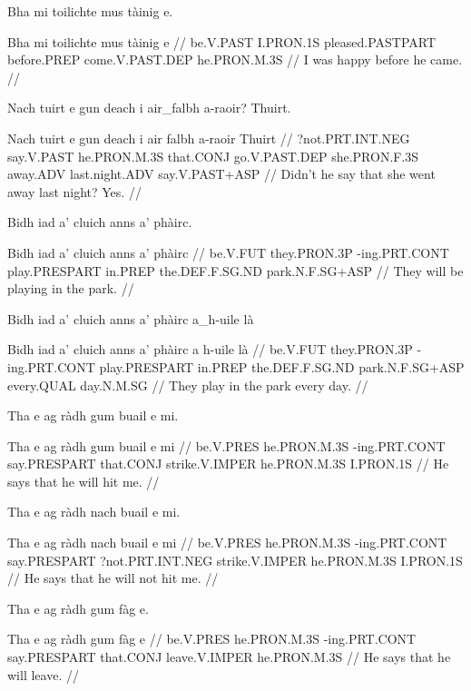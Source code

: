 \documentclass[a4paper,10pt]{article}
\begin{document}
\ex
\begingl
\glpre Bha mi toilichte mus tàinig e. 

\vspace{4mm}
\gla Bha mi toilichte mus tàinig e  //
\glb be.V.PAST I.PRON.1S pleased.PASTPART before.PREP come.V.PAST.DEP he.PRON.M.3S  //
\glft I was happy before he came. //
\endgl
\xe

\ex
\begingl
\glpre Nach tuirt e gun deach i air\_falbh a-raoir? Thuirt. 

\vspace{4mm}
\gla Nach tuirt e gun deach i {air falbh} a-raoir Thuirt  //
\glb ?not.PRT.INT.NEG say.V.PAST he.PRON.M.3S that.CONJ go.V.PAST.DEP she.PRON.F.3S away.ADV last.night.ADV say.V.PAST+ASP  //
\glft Didn't he say that she went away last night? Yes. //
\endgl
\xe

\ex
\begingl
\glpre Bidh iad a' cluich anns a' phàirc. 

\vspace{4mm}
\gla Bidh iad a' cluich anns a' phàirc  //
\glb be.V.FUT they.PRON.3P -ing.PRT.CONT play.PRESPART in.PREP the.DEF.F.SG.ND park.N.F.SG+ASP  //
\glft They will be playing in the park. //
\endgl
\xe

\ex
\begingl
\glpre Bidh iad a' cluich anns a' phàirc a\_h-uile là 

\vspace{4mm}
\gla Bidh iad a' cluich anns a' phàirc {a h-uile} là  //
\glb be.V.FUT they.PRON.3P -ing.PRT.CONT play.PRESPART in.PREP the.DEF.F.SG.ND park.N.F.SG+ASP every.QUAL day.N.M.SG  //
\glft They play in the park every day. //
\endgl
\xe

\ex
\begingl
\glpre Tha e ag ràdh gum buail e mi. 

\vspace{4mm}
\gla Tha e ag ràdh gum buail e mi  //
\glb be.V.PRES he.PRON.M.3S -ing.PRT.CONT say.PRESPART that.CONJ strike.V.IMPER he.PRON.M.3S I.PRON.1S  //
\glft He says that he will hit me. //
\endgl
\xe

\ex
\begingl
\glpre Tha e ag ràdh nach buail e mi. 

\vspace{4mm}
\gla Tha e ag ràdh nach buail e mi  //
\glb be.V.PRES he.PRON.M.3S -ing.PRT.CONT say.PRESPART ?not.PRT.INT.NEG strike.V.IMPER he.PRON.M.3S I.PRON.1S  //
\glft He says that he will not hit me. //
\endgl
\xe

\ex
\begingl
\glpre Tha e ag ràdh gum fàg e. 

\vspace{4mm}
\gla Tha e ag ràdh gum fàg e  //
\glb be.V.PRES he.PRON.M.3S -ing.PRT.CONT say.PRESPART that.CONJ leave.V.IMPER he.PRON.M.3S  //
\glft He says that he will leave. //
\endgl
\xe
\end{document}

